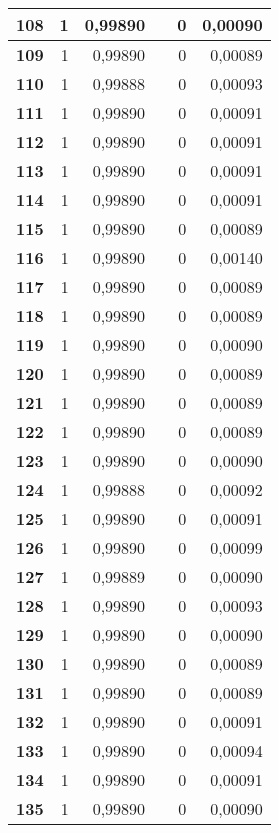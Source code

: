 \begin{longtable}{|r|r|r|l|r|r|}
\textbf{108} & 1 & 0,99890 &  & 0 & 0,00090 \\ \hline
\textbf{109} & 1 & 0,99890 &  & 0 & 0,00089 \\ \hline
\textbf{110} & 1 & 0,99888 &  & 0 & 0,00093 \\ \hline
\textbf{111} & 1 & 0,99890 &  & 0 & 0,00091 \\ \hline
\textbf{112} & 1 & 0,99890 &  & 0 & 0,00091 \\ \hline
\textbf{113} & 1 & 0,99890 &  & 0 & 0,00091 \\ \hline
\textbf{114} & 1 & 0,99890 &  & 0 & 0,00091 \\ \hline
\textbf{115} & 1 & 0,99890 &  & 0 & 0,00089 \\ \hline
\textbf{116} & 1 & 0,99890 &  & 0 & 0,00140 \\ \hline
\textbf{117} & 1 & 0,99890 &  & 0 & 0,00089 \\ \hline
\textbf{118} & 1 & 0,99890 &  & 0 & 0,00089 \\ \hline
\textbf{119} & 1 & 0,99890 &  & 0 & 0,00090 \\ \hline
\textbf{120} & 1 & 0,99890 &  & 0 & 0,00089 \\ \hline
\textbf{121} & 1 & 0,99890 &  & 0 & 0,00089 \\ \hline
\textbf{122} & 1 & 0,99890 &  & 0 & 0,00089 \\ \hline
\textbf{123} & 1 & 0,99890 &  & 0 & 0,00090 \\ \hline
\textbf{124} & 1 & 0,99888 &  & 0 & 0,00092 \\ \hline
\textbf{125} & 1 & 0,99890 &  & 0 & 0,00091 \\ \hline
\textbf{126} & 1 & 0,99890 &  & 0 & 0,00099 \\ \hline
\textbf{127} & 1 & 0,99889 &  & 0 & 0,00090 \\ \hline
\textbf{128} & 1 & 0,99890 &  & 0 & 0,00093 \\ \hline
\textbf{129} & 1 & 0,99890 &  & 0 & 0,00090 \\ \hline
\textbf{130} & 1 & 0,99890 &  & 0 & 0,00089 \\ \hline
\textbf{131} & 1 & 0,99890 &  & 0 & 0,00089 \\ \hline
\textbf{132} & 1 & 0,99890 &  & 0 & 0,00091 \\ \hline
\textbf{133} & 1 & 0,99890 &  & 0 & 0,00094 \\ \hline
\textbf{134} & 1 & 0,99890 &  & 0 & 0,00091 \\ \hline
\textbf{135} & 1 & 0,99890 &  & 0 & 0,00090 \\ \hline

\end{longtable}
